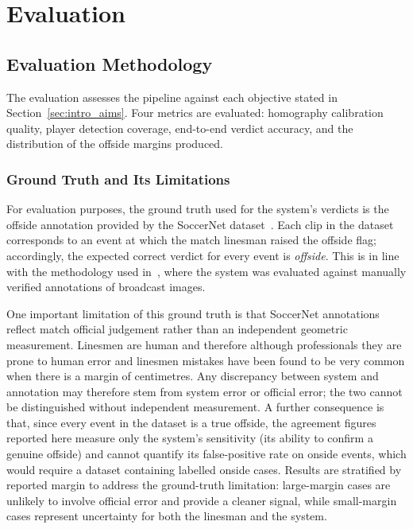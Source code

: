 \chapter{Evaluation}%
\label{chp:evaluation}

\section{Evaluation Methodology}%
\label{sec:eval_methodology}

The evaluation assesses the pipeline against each objective stated in Section~\ref{sec:intro_aims}. Four metrics are evaluated:  homography calibration quality, player detection coverage, end-to-end verdict accuracy, and the distribution of the offside margins produced.

\subsection{Ground Truth and Its Limitations}

For evaluation purposes, the ground truth used for the system's verdicts is the offside annotation provided by the SoccerNet dataset~\cite{giancola2018soccernet,deliegev2soccernet}. Each clip in the dataset corresponds to an event at which the match linesman raised the offside flag; accordingly, the expected correct verdict for every event is \emph{offside}. This is in line with the methodology used in~\cite{panse2020dataset}, where the system was evaluated against manually verified annotations of broadcast images.

One important limitation of this ground truth is that SoccerNet annotations reflect match official judgement rather than an independent geometric measurement. Linesmen are human and therefore although professionals they are prone to human error and linesmen mistakes have been found to be very common when there is a margin of centimetres. Any discrepancy between system and annotation may therefore stem from system error or official error; the two cannot be distinguished without independent measurement. A further consequence is that, since every event in the dataset is a true offside, the agreement figures reported here measure only the system's sensitivity (its ability to confirm a genuine offside) and cannot quantify its false-positive rate on onside events, which would require a dataset containing labelled onside cases. Results are stratified by reported margin to address the ground-truth limitation: large-margin cases are unlikely to involve official error and provide a cleaner signal, while small-margin cases represent uncertainty for both the linesman and the system.


